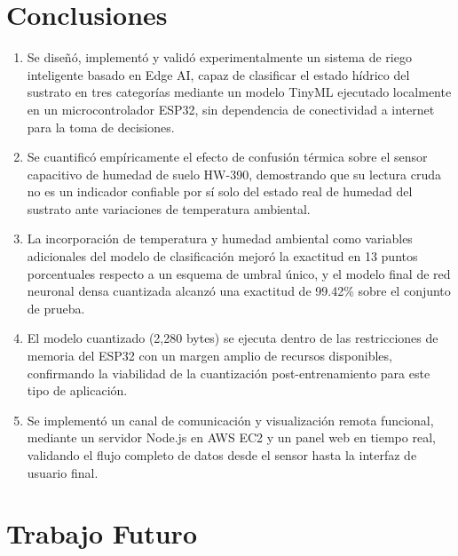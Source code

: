 \documentclass[12pt,a4paper]{article}
\begin{document}
\section{Conclusiones}

\begin{enumerate}
    \item Se diseñó, implementó y validó experimentalmente un sistema de riego inteligente basado en Edge AI, capaz de clasificar el estado hídrico del sustrato en tres categorías mediante un modelo TinyML ejecutado localmente en un microcontrolador ESP32, sin dependencia de conectividad a internet para la toma de decisiones.
    \item Se cuantificó empíricamente el efecto de confusión térmica sobre el sensor capacitivo de humedad de suelo HW-390, demostrando que su lectura cruda no es un indicador confiable por sí solo del estado real de humedad del sustrato ante variaciones de temperatura ambiental.
    \item La incorporación de temperatura y humedad ambiental como variables adicionales del modelo de clasificación mejoró la exactitud en 13 puntos porcentuales respecto a un esquema de umbral único, y el modelo final de red neuronal densa cuantizada alcanzó una exactitud de 99.42\% sobre el conjunto de prueba.
    \item El modelo cuantizado (2{,}280 bytes) se ejecuta dentro de las restricciones de memoria del ESP32 con un margen amplio de recursos disponibles, confirmando la viabilidad de la cuantización post-entrenamiento para este tipo de aplicación.
    \item Se implementó un canal de comunicación y visualización remota funcional, mediante un servidor Node.js en AWS EC2 y un panel web en tiempo real, validando el flujo completo de datos desde el sensor hasta la interfaz de usuario final.
\end{enumerate}

\section{Trabajo Futuro}
\end{document}
